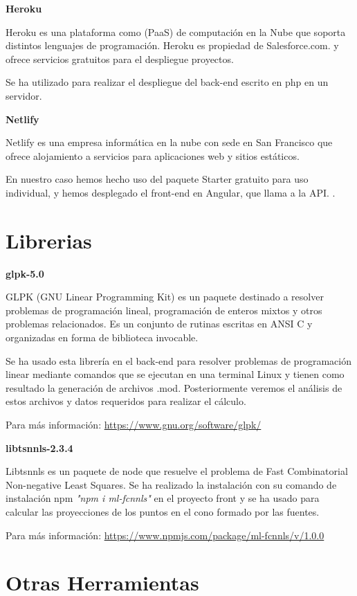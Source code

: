 \textbf{Heroku}

Heroku es una plataforma como  (PaaS) de computación en la Nube que soporta distintos lenguajes de programación. Heroku es propiedad de Salesforce.com. y ofrece servicios gratuitos para el despliegue proyectos.

Se ha utilizado para realizar el despliegue del back-end escrito en php en un servidor. 

\textbf{Netlify}

Netlify es una empresa  informática en la nube con sede en San Francisco que ofrece alojamiento a servicios para aplicaciones web y sitios estáticos.

En nuestro caso hemos hecho uso del paquete Starter gratuito para uso individual, y hemos desplegado el front-end en Angular, que llama a la API. .

\section{Librerias}

\textbf{glpk-5.0}

GLPK (GNU Linear Programming Kit) es un paquete destinado a resolver problemas de programación lineal, programación de enteros mixtos y otros problemas relacionados. Es un conjunto de rutinas  escritas en ANSI C y organizadas en forma de biblioteca invocable.

Se ha usado esta  librería en el back-end para resolver problemas de programación  linear mediante comandos que se ejecutan en una terminal Linux y tienen como resultado la generación de archivos .mod. Posteriormente veremos el análisis de estos archivos y datos requeridos para realizar el cálculo.

Para más información: \url{https://www.gnu.org/software/glpk/}

\textbf{libtsnnls-2.3.4}

Libtsnnls es un paquete de node que resuelve el problema de Fast Combinatorial Non-negative Least Squares. Se ha realizado la instalación con su comando  de instalación npm \textit{"npm i ml-fcnnls"} en el proyecto front y se ha usado para calcular las proyecciones de los puntos en el cono formado por las fuentes.

Para más información: \url{https://www.npmjs.com/package/ml-fcnnls/v/1.0.0}


\section{Otras Herramientas}

